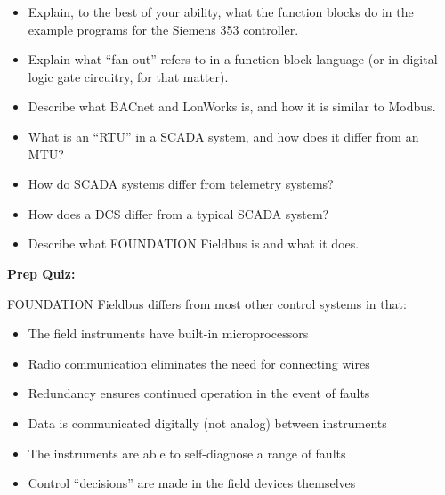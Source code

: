 \begin{itemize}
\item{} Explain, to the best of your ability, what the function blocks do in the example programs for the Siemens 353 controller.
\item{} Explain what ``fan-out'' refers to in a function block language (or in digital logic gate circuitry, for that matter).
\item{} Describe what BACnet and LonWorks is, and how it is similar to Modbus.
\item{} What is an ``RTU'' in a SCADA system, and how does it differ from an MTU?
\item{} How do SCADA systems differ from telemetry systems?
\item{} How does a DCS differ from a typical SCADA system?
\item{} Describe what FOUNDATION Fieldbus is and what it does.
\end{itemize}










\vfil \eject

\noindent
{\bf Prep Quiz:}

FOUNDATION Fieldbus differs from most other control systems in that:

\begin{itemize}
\item{} The field instruments have built-in microprocessors
\vskip 5pt 
\item{} Radio communication eliminates the need for connecting wires
\vskip 5pt 
\item{} Redundancy ensures continued operation in the event of faults
\vskip 5pt 
\item{} Data is communicated digitally (not analog) between instruments
\vskip 5pt 
\item{} The instruments are able to self-diagnose a range of faults
\vskip 5pt 
\item{} Control ``decisions'' are made in the field devices themselves
\end{itemize}




